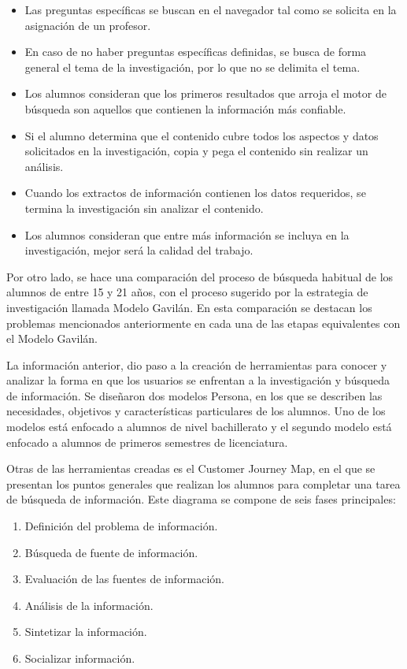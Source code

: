 \begin{itemize}
  \item Las preguntas específicas se buscan en el navegador tal como se solicita en la asignación de un profesor.
  \item En caso de no haber preguntas específicas definidas, se busca de forma general el tema de la investigación, por lo que no se delimita el tema.
  \item Los alumnos consideran que los primeros resultados que arroja el motor de búsqueda son aquellos que contienen la información más confiable.
  \item Si el alumno determina que el contenido cubre todos los aspectos y datos solicitados en la investigación, copia y pega el contenido sin realizar un análisis.
  \item Cuando los extractos de información contienen los datos requeridos, se termina la investigación sin analizar el contenido.
  \item Los alumnos consideran que entre más información se incluya en la investigación, mejor será la calidad del trabajo.
\end{itemize}

Por otro lado, se hace una comparación del proceso de búsqueda habitual de los alumnos de entre 15 y 21 años, con el proceso sugerido por la estrategia de investigación llamada Modelo Gavilán. En esta comparación se destacan los problemas mencionados anteriormente en cada una de las etapas equivalentes con el Modelo Gavilán.

La información anterior, dio paso a la creación de herramientas para conocer y analizar la forma en que los usuarios se enfrentan a la investigación y búsqueda de información. Se diseñaron dos modelos Persona, en los que se describen las necesidades, objetivos y características particulares de los alumnos. Uno de los modelos está enfocado a alumnos de nivel bachillerato y el segundo modelo está enfocado a alumnos de primeros semestres de licenciatura.

Otras de las herramientas creadas es el Customer Journey Map, en el que se presentan los puntos generales que realizan los alumnos para completar una tarea de búsqueda de información. Este diagrama se compone de seis fases principales:

\begin{enumerate}
  \item Definición del problema de información.
  \item Búsqueda de fuente de información.
  \item Evaluación de las fuentes de información.
  \item Análisis de la información.
  \item Sintetizar la información.
  \item Socializar información.
\end{enumerate}

